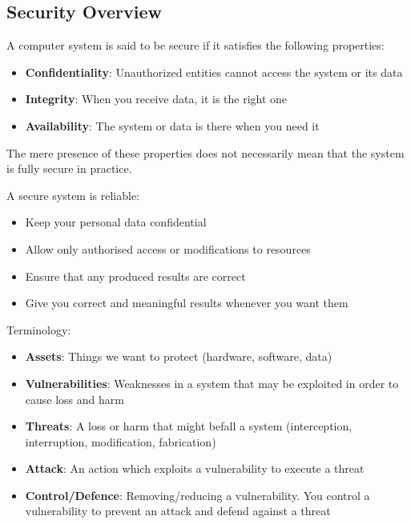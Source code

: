 \subsection{Security Overview}

A computer system is said to be secure if it satisfies the following properties:
\begin{itemize}
\item {\bf Confidentiality}: Unauthorized entities cannot access the system or its data
\item {\bf Integrity}: When you receive data, it is the right one
\item {\bf Availability}: The system or data is there when you need it
\end{itemize}

\begin{rem}
The mere presence of these properties does not necessarily mean that the system is fully secure in practice.
\end{rem}

A secure system is reliable:

\begin{itemize}
    \item Keep your personal data confidential 
    \item Allow only authorised access or modifications to resources
    \item Ensure that any produced results are correct
    \item Give you correct and meaningful results whenever you want them
\end{itemize}


Terminology:

\begin{itemize}
    \item {\bf{Assets}}: Things we want to protect (hardware, software, data)
    \item {\bf{Vulnerabilities}}: Weaknesses in a system that may be exploited in order to cause loss and harm
    \item {\bf{Threats}}: A loss or harm that might befall a system (interception, interruption, modification, fabrication)
    \item {\bf{Attack}}: An action which exploits a vulnerability to execute a threat 
    \item {\bf{Control/Defence}}: Removing/reducing a vulnerability. You control a vulnerability to prevent an attack and defend against a threat
\end{itemize}

